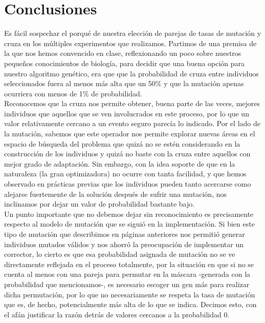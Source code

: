 \documentclass[12pt]{article}
\begin{document}
\section*{Conclusiones}
Es fácil sospechar el porqué de nuestra elección de parejas de tasas de mutación y cruza en
los múltiples experimentos que realizamos.
Partimos de una premisa de la que nos hemos convencido en clase,
reflexionando un poco sobre nuestros pequeños conocimientos de biología,
para decidir que  una buena opción para nuestro algoritmo genético, era que que
la probabilidad de cruza entre individuos seleccionados fuera al menos más alta
que un 50\% y que la mutación apenas ocurriera con menos de 1\% de probabilidad. \\

Reconocemos que la cruza nos permite obtener, buena parte de las veces, mejores
individuos que aquellos que se ven involucrados en este proceso, por lo que un
valor relativamente cercano a un evento seguro parecía lo indicado.
Por el lado de la mutación, sabemos que este operador nos permite explorar
nuevas áreas en el espacio de búsqueda del problema que quizá no se estén
considerando en la construcción de los individuos y quizá no baste con la cruza
entre aquellos con mejor grado de adaptación. Sin embargo, con la idea
soporte de que en la naturaleza (la gran optimizadora) no ocurre con tanta
facilidad, y que hemos observado en prácticas previas que los individuos pueden
tanto acercarse como alejarse fuertemente de la solución después de sufrir una
mutación, nos inclinamos por dejar un valor de probabilidad bastante bajo. \\

Un punto importante que no debemos dejar sin reconocimiento es precisamente
respecto al modelo de mutación que se siguió en la implementación.
Si bien este tipo de mutación que describimos en páginas anteriores nos permitió
generar individuos mutados válidos y nos ahorró la preocupación de implementar
un corrector, lo cierto es que esa probabilidad asignada de mutación no se ve
directamente reflejada en el proceso totalmente, por la situación en que si
no se cuenta al menos con una pareja para permutar en la máscara -generada con
la probabilidad que mencionamos-, es necesario escoger un gen más para realizar
dicha permutación, por lo que no necesariamente se respeta la tasa de mutación
que es, de hecho, potencialmente más alta de lo que se indica.
Decimos esto, con el afán justificar la razón detrás de valores cercanos a la
probabilidad 0.\\
\end{document}
